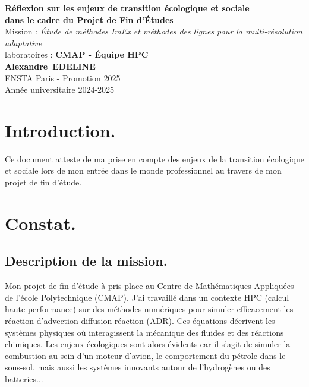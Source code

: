 \documentclass[11pt,a4paper]{article}
\newcommand{\nom}{EDELINE}
\newcommand{\prenom}{Alexandre}
\newcommand{\formation}{ENSTA Paris - Promotion 2025}
\newcommand{\annee}{2024-2025}
\newcommand{\entreprise}{CMAP - Équipe HPC}
\newcommand{\titreMission}{Étude de méthodes ImEx et méthodes des lignes pour la multi-résolution adaptative}
\begin{document}
\begin{titlepage}
    \centering
    \vspace*{2cm}
    
    {\LARGE \textbf{Réflexion sur les enjeux de transition écologique et sociale}}\\[0.5cm]
    {\Large \textbf{dans le cadre du Projet de Fin d'Études}}\\[2cm]
    
    {\large Mission : \textit{\titreMission}}\\[0.5cm]
    {\large laboratoires : \textbf{\entreprise}}\\[2cm]
    
    {\large \textbf{\prenom\ \nom}}\\[0.5cm]
    {\large \formation}\\[0.5cm]
    {\large Année universitaire \annee}\\[4cm]
    
\end{titlepage}

\newpage


\section*{Introduction.}
  Ce document atteste de ma prise en compte des enjeux de la transition écologique et sociale lors de mon entrée dans le monde professionnel au travers de mon projet de fin d'étude.
\section{Constat.}
  \subsection{Description de la mission.}
  Mon projet de fin d'étude à pris place au Centre de Mathématiques Appliquées de l'école Polytechnique (CMAP). 
  J'ai travaillé dans un contexte HPC (calcul haute performance) sur des méthodes numériques pour simuler efficacement les réaction d'advection-diffusion-réaction (ADR).
  Ces équations décrivent les systèmes physiques où interagissent la mécanique des fluides et des réactions chimiques.
  Les enjeux écologiques sont alors évidents car il s'agit de simuler la combustion au sein d'un moteur d'avion, 
  le comportement du pétrole dans le sous-sol, mais aussi les systèmes innovants autour de l'hydrogènes ou des batteries...
\end{document}

